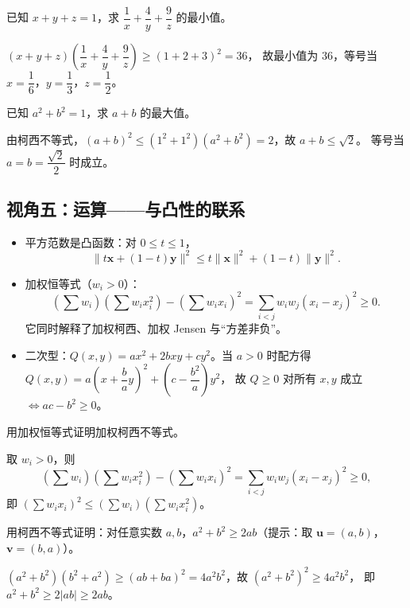 \begin{explore}
\begin{problem}
已知 $x+y+z=1$，求 $\dfrac1x+\dfrac4y+\dfrac9z$ 的最小值。
\end{problem}
\begin{solution}
$(x+y+z)\left(\dfrac1x+\dfrac4y+\dfrac9z\right)\geq(1+2+3)^2=36$，
故最小值为 $36$，等号当 $x=\dfrac16$，$y=\dfrac13$，$z=\dfrac12$。
\end{solution}

\begin{problem}
已知 $a^2+b^2=1$，求 $a+b$ 的最大值。
\end{problem}
\begin{solution}
由柯西不等式，$(a+b)^2\leq(1^2+1^2)(a^2+b^2)=2$，故 $a+b\leq\sqrt2$。
等号当 $a=b=\dfrac{\sqrt2}{2}$ 时成立。
\end{solution}

\subsection{视角五：运算——与凸性的联系}

\begin{itemize}
  \item 平方范数是凸函数：对 $0\leq t\leq1$，
  \[
    \|t\mathbf x+(1-t)\mathbf y\|^2\leq t\|\mathbf x\|^2+(1-t)\|\mathbf y\|^2.
  \]
  \item 加权恒等式（$w_i>0$）：
  \[
    \left(\sum w_i\right)\left(\sum w_ix_i^2\right)-\left(\sum w_ix_i\right)^2
    =\sum_{i<j}w_iw_j(x_i-x_j)^2\geq0.
  \]
  它同时解释了加权柯西、加权 Jensen 与“方差非负”。
  \item 二次型：$Q(x,y)=ax^2+2bxy+cy^2$。当 $a>0$ 时配方得
  $Q(x,y)=a\left(x+\dfrac ba y\right)^2+\left(c-\dfrac{b^2}{a}\right)y^2$，
  故 $Q\geq0$ 对所有 $x,y$ 成立 $\iff ac-b^2\geq0$。
\end{itemize}

\begin{example}
用加权恒等式证明加权柯西不等式。
\end{example}
\begin{solution}
取 $w_i>0$，则
\[
  \left(\sum w_i\right)\left(\sum w_ix_i^2\right)-\left(\sum w_ix_i\right)^2
  =\sum_{i<j}w_iw_j(x_i-x_j)^2\geq0,
\]
即 $\left(\sum w_ix_i\right)^2\leq\left(\sum w_i\right)\left(\sum w_ix_i^2\right)$。
\end{solution}

\begin{problem}
用柯西不等式证明：对任意实数 $a,b$，$a^2+b^2\geq2ab$（提示：取 $\mathbf u=(a,b)$，$\mathbf v=(b,a)$）。
\end{problem}
\begin{solution}
$(a^2+b^2)(b^2+a^2)\geq(ab+ba)^2=4a^2b^2$，故 $(a^2+b^2)^2\geq4a^2b^2$，
即 $a^2+b^2\geq2|ab|\geq2ab$。
\end{solution}
\end{explore}

